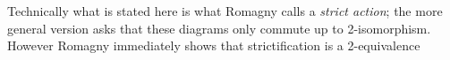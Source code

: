 \begin{remark}\label{rl-0005}
  Technically what is stated here is what Romagny calls a \emph{strict action}; the more general version asks that these diagrams only commute up to 2-isomorphism. However Romagny immediately shows that strictification is a 2-equivalence \cite[Proposition 1.5]{romagny_GroupActionsStacks2005}
\end{remark}
